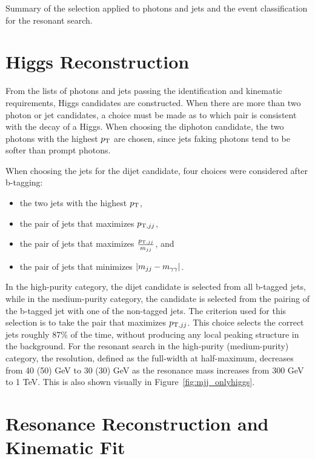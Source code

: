 \begin{table}[ht]
  \centering
  \renewcommand{\arraystretch}{1.4}
  \caption{Summary of the selection applied to photons and jets and the event classification
for the resonant search.}
  
  \label{table:gencut}
\end{table}

\section{Higgs Reconstruction\label{sec:higgsreconstruction}}

From the lists of photons and jets passing the identification and kinematic requirements, Higgs
candidates are constructed. When there are more than two photon or jet candidates, a choice
must be made as to which pair is consistent with the decay of a Higgs. When
choosing the diphoton candidate, the two photons with the highest $p_{\rm T}$ are chosen, since
jets faking photons tend to be softer than prompt photons.

When choosing the jets for the dijet candidate, four choices were considered after b-tagging:
\begin{itemize}
\item the two jets with the highest $p_{\rm T}$,
\item the pair of jets that maximizes $p_{{\rm T},jj}$,
\item the pair of jets that maximizes $\frac{p_{{\rm T},jj}}{m_{jj}}$, and
\item the pair of jets that minimizes $|m_{jj}-m_{\gamma\gamma}|$.
\end{itemize}
In the high-purity category, the dijet candidate is selected from all b-tagged jets,
while in the medium-purity category, the candidate is selected from the pairing of the b-tagged jet
with one of the non-tagged jets.
The criterion used for this selection is to take the pair that maximizes $p_{{\rm T},jj}$. 
This choice selects the correct jets roughly 87\% of the time, without producing any local peaking
structure in the background. For the resonant search
in the high-purity (medium-purity) category, the resolution, defined as the full-width at half-maximum,
decreases from 40 (50) GeV to 30 (30) GeV as the resonance mass increases from 300 GeV to 1 TeV.
This is also shown visually in Figure~\ref{fig:mjj_onlyhiggs}.

\section{Resonance Reconstruction and Kinematic Fit\label{sec:Xreconstruction}}

